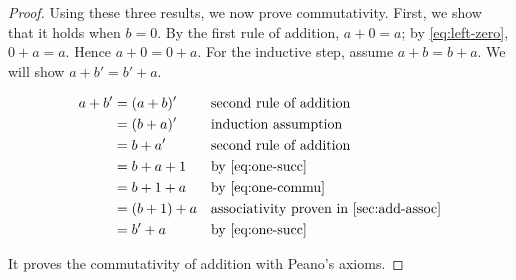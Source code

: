\begin{proof}
Using these three results, we now prove commutativity. First, we show that it holds when $b=0$. By the first rule of addition, $a+0=a$; by \cref{eq:left-zero}, $0+a=a$. Hence $a+0=0+a$. For the inductive step, assume $a+b=b+a$. We will show $a+b'=b'+a$.

\begin{align*}
a + b' & = (a + b)' && \text{second rule of addition} \\
       & = (b + a)' && \text{induction assumption} \\
       & = b + a'   && \text{second rule of addition} \\
       & = b + a + 1 && \text{by \cref{eq:one-succ}} \\
       & = b + 1 + a && \text{by \cref{eq:one-commu}} \\
       & = (b + 1) + a && \text{associativity proven in \cref{sec:add-assoc}} \\
       & = b' + a  && \text{by \cref{eq:one-succ}}
\end{align*}

It proves the commutativity of addition with Peano's axioms.

\end{proof}
